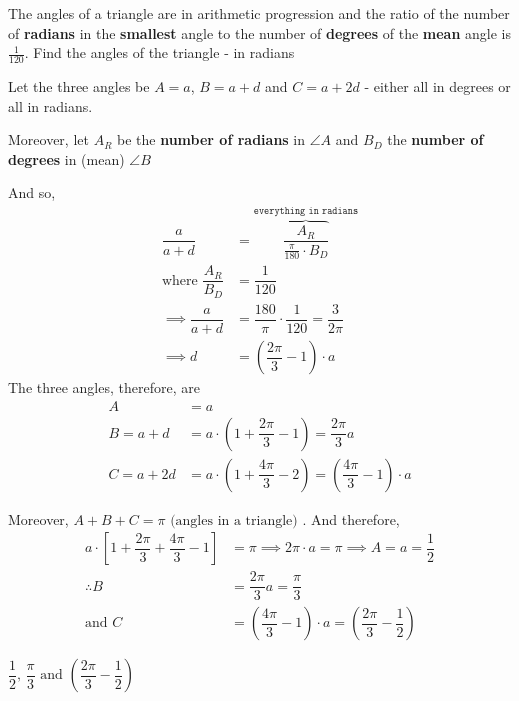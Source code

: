 

\question[3] The angles of a triangle are in arithmetic progression and the ratio of 
the number of \textbf{radians} in the \textbf{smallest} angle to the number of 
\textbf{degrees} of the \textbf{mean} angle is $\frac{1}{120}$. Find the angles 
of the triangle - in radians 


\ifprintanswers
\fi 

\begin{solution}[\halfpage]
   Let the three angles be $A=a$, $B=a+d$ and $C=a+2d$ - either all in degrees or all in radians. 

   Moreover, let $A_R$ be the \textbf{number of radians} in $\angle A$ and $B_D$ the
   \textbf{number of degrees} in (mean) $\angle B$
   
   And so, 
   \begin{align}
       \dfrac{a}{a+d} &= \overbrace{\dfrac{A_R}{\frac{\pi}{180}\cdot B_D}}^{\texttt{everything in radians}} \\
       \text{where } \dfrac{A_R}{B_D} &= \dfrac{1}{120} \\
       \implies \dfrac{a}{a+d} &= \dfrac{180}{\pi}\cdot\dfrac{1}{120} = \dfrac{3}{2\pi} \\
       \implies d &= \left( \dfrac{2\pi}{3}-1\right)\cdot a 
   \end{align}
   The three angles, therefore, are 
   \begin{align}
      A &= a \\
      B = a + d &= a\cdot\left(1 + \dfrac{2\pi}{3} - 1 \right) = \dfrac{2\pi}{3}a\\
      C = a + 2d &= a\cdot\left( 1 + \dfrac{4\pi}{3} - 2\right) = \left( \dfrac{4\pi}{3} - 1\right)\cdot a
   \end{align} 
  
    Moreover, $A+B+C=\pi\text{ (angles in a triangle) }$. And therefore,
   \begin{align}
      a\cdot\left[1 + \dfrac{2\pi}{3} + \dfrac{4\pi}{3} - 1 \right] &= \pi\implies 2\pi\cdot a = \pi \implies A = a=\dfrac{1}{2}\\
      \therefore B &= \dfrac{2\pi}{3}a = \dfrac{\pi}{3} \\
      \text{and }C &= 
      \left(\dfrac{4\pi}{3} - 1 \right)\cdot a = 
      \left(\dfrac{2\pi}{3} - \dfrac{1}{2} \right)
   \end{align}
\end{solution}
\ifprintanswers
  \begin{codex}
    $\dfrac{1}{2},\,\dfrac\pi{3}\text{ and }\left(\dfrac{2\pi}{3}-\dfrac{1}{2} \right)$
  \end{codex}
\fi

